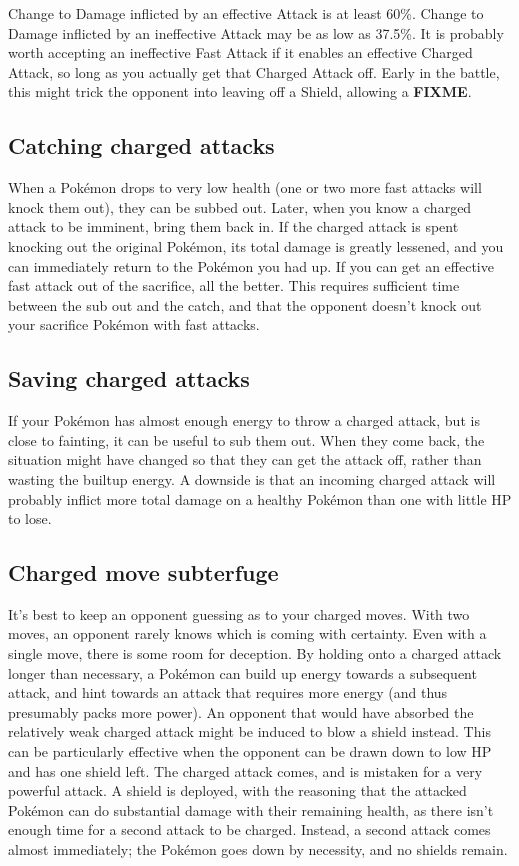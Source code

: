 Change to Damage inflicted by an effective Attack is at least 60\%.
Change to Damage inflicted by an ineffective Attack may be as
 low as 37.5\%.
It is probably worth accepting an ineffective Fast Attack if it
 enables an effective Charged Attack, so long as you actually
 get that Charged Attack off.
Early in the battle, this might trick the opponent into leaving
 off a Shield, allowing a \textbf{FIXME}.

\subsection{Catching charged attacks}
When a Pokémon drops to very low health (one or two more fast attacks will knock
 them out), they can be subbed out.
Later, when you know a charged attack to be imminent, bring them back in.
If the charged attack is spent knocking out the original Pokémon, its total
 damage is greatly lessened, and you can immediately return to the Pokémon
 you had up.
If you can get an effective fast attack out of the sacrifice, all the better.
This requires sufficient time between the sub out and the catch, and that the
 opponent doesn't knock out your sacrifice Pokémon with fast attacks.

\subsection{Saving charged attacks}
If your Pokémon has almost enough energy to throw a charged attack, but is close to fainting, it can be useful to sub them out.
When they come back, the situation might have changed so that they can get the attack off,
 rather than wasting the builtup energy.
A downside is that an incoming charged attack will probably inflict more total
 damage on a healthy Pokémon than one with little HP to lose.

\subsection{Charged move subterfuge}
It's best to keep an opponent guessing as to your charged moves.
With two moves, an opponent rarely knows which is coming with certainty.
Even with a single move, there is some room for deception.
By holding onto a charged attack longer than necessary, a Pokémon can build
  up energy towards a subsequent attack, and hint towards an attack
  that requires more energy (and thus presumably packs more power).
An opponent that would have absorbed the relatively weak charged attack
  might be induced to blow a shield instead.
This can be particularly effective when the opponent can be drawn down to low HP
  and has one shield left.
The charged attack comes, and is mistaken for a very powerful attack.
A shield is deployed, with the reasoning that the attacked Pokémon can
  do substantial damage with their remaining health, as there isn't
  enough time for a second attack to be charged.
Instead, a second attack comes almost immediately; the Pokémon goes
  down by necessity, and no shields remain.

